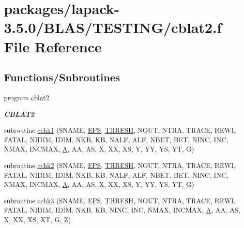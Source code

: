 \hypertarget{cblat2_8f}{}\section{packages/lapack-\/3.5.0/\+B\+L\+A\+S/\+T\+E\+S\+T\+I\+N\+G/cblat2.f File Reference}
\label{cblat2_8f}
\subsection*{Functions/\+Subroutines}
\begin{DoxyCompactItemize}
\item 
program \hyperlink{group__complex__blas__testing_ga3a3c750016b421ea7a2616bdbf3dc1e2}{cblat2}
\begin{DoxyCompactList}\small\item\em {\bfseries C\+B\+L\+A\+T2} \end{DoxyCompactList}\item 
subroutine \hyperlink{cblat2_8f_a65cb1b19777f5edda9348a406dc34b6b}{cchk1} (S\+N\+A\+M\+E, \hyperlink{tukey_8c_a6ebf6899d6c1c8b7b9d09be872c05aae}{E\+P\+S}, \hyperlink{zlaqgs_8c_a0656018abfc9fa2821827415f5d5ea57}{T\+H\+R\+E\+S\+H}, N\+O\+U\+T, N\+T\+R\+A, T\+R\+A\+C\+E, R\+E\+W\+I, F\+A\+T\+A\+L, N\+I\+D\+I\+M, I\+D\+I\+M, N\+K\+B, K\+B, N\+A\+L\+F, A\+L\+F, N\+B\+E\+T, B\+E\+T, N\+I\+N\+C, I\+N\+C, N\+M\+A\+X, I\+N\+C\+M\+A\+X, \hyperlink{classA}{A}, A\+A, A\+S, X, X\+X, X\+S, Y, Y\+Y, Y\+S, Y\+T, G)
\item 
subroutine \hyperlink{cblat2_8f_a8fd9cd10cd97ae603a0c92f9a7b6b2de}{cchk2} (S\+N\+A\+M\+E, \hyperlink{tukey_8c_a6ebf6899d6c1c8b7b9d09be872c05aae}{E\+P\+S}, \hyperlink{zlaqgs_8c_a0656018abfc9fa2821827415f5d5ea57}{T\+H\+R\+E\+S\+H}, N\+O\+U\+T, N\+T\+R\+A, T\+R\+A\+C\+E, R\+E\+W\+I, F\+A\+T\+A\+L, N\+I\+D\+I\+M, I\+D\+I\+M, N\+K\+B, K\+B, N\+A\+L\+F, A\+L\+F, N\+B\+E\+T, B\+E\+T, N\+I\+N\+C, I\+N\+C, N\+M\+A\+X, I\+N\+C\+M\+A\+X, \hyperlink{classA}{A}, A\+A, A\+S, X, X\+X, X\+S, Y, Y\+Y, Y\+S, Y\+T, G)
\item 
subroutine \hyperlink{cblat2_8f_a222cb14025b5bfec61ab26975d9e38e0}{cchk3} (S\+N\+A\+M\+E, \hyperlink{tukey_8c_a6ebf6899d6c1c8b7b9d09be872c05aae}{E\+P\+S}, \hyperlink{zlaqgs_8c_a0656018abfc9fa2821827415f5d5ea57}{T\+H\+R\+E\+S\+H}, N\+O\+U\+T, N\+T\+R\+A, T\+R\+A\+C\+E, R\+E\+W\+I, F\+A\+T\+A\+L, N\+I\+D\+I\+M, I\+D\+I\+M, N\+K\+B, K\+B, N\+I\+N\+C, I\+N\+C, N\+M\+A\+X, I\+N\+C\+M\+A\+X, \hyperlink{classA}{A}, A\+A, A\+S, X, X\+X, X\+S, X\+T, G, Z)

\end{DoxyCompactItemize}
